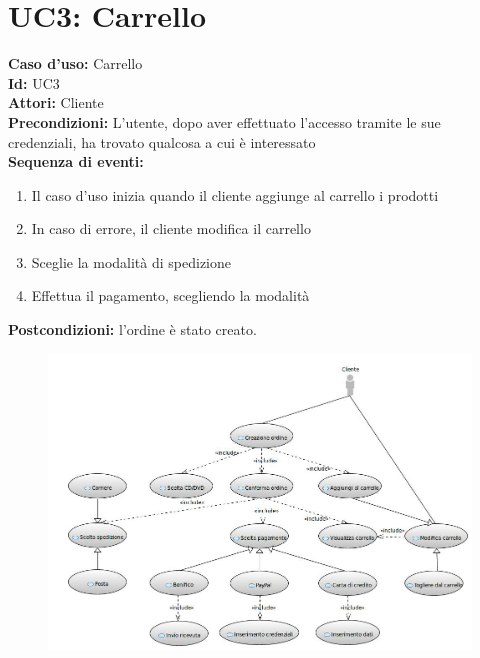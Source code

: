 \documentclass[a4paper,12pt]{report}
\begin{document}
	\newpage
	\section*{UC3: Carrello}
	\noindent
	\textbf{Caso d'uso:} Carrello\\
	\textbf{Id:} UC3\\
	\textbf{Attori:} Cliente\\
	\textbf{Precondizioni:} L'utente, dopo aver effettuato l'accesso tramite le sue credenziali, ha trovato qualcosa a cui è interessato\\
	\textbf{Sequenza di eventi:}
	\begin{enumerate} 
		\item Il caso d'uso inizia quando il cliente aggiunge al carrello i prodotti
		\item In caso di errore, il cliente modifica il carrello
		\item Sceglie la modalità di spedizione
		\item Effettua il pagamento, scegliendo la modalità
	\end{enumerate}
	\textbf{Postcondizioni:} l'ordine è stato creato.
	
	\begin{figure}[h]
		\centering
		\includegraphics[width=\textwidth]{Carrello}
	\end{figure}
	
	\newpage
\end{document}
